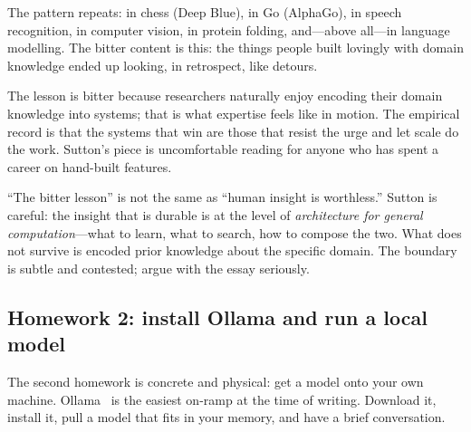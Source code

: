 The pattern repeats: in chess (Deep Blue), in Go (AlphaGo),
in speech recognition, in computer vision, in protein
folding, and---above all---in language modelling.  The bitter
content is this: the things people built lovingly with
domain knowledge ended up looking, in retrospect, like
detours.

\begin{intuition}
  The lesson is bitter because researchers naturally enjoy
  encoding their domain knowledge into systems; that is what
  expertise feels like in motion.  The empirical record is
  that the systems that win are those that resist the urge
  and let scale do the work.  Sutton's piece is uncomfortable
  reading for anyone who has spent a career on hand-built
  features.
\end{intuition}

\begin{remark}
  ``The bitter lesson'' is not the same as ``human insight is
  worthless.''  Sutton is careful: the insight that is durable
  is at the level of \emph{architecture for general
  computation}---what to learn, what to search, how to compose
  the two.  What does not survive is encoded prior knowledge
  about the specific domain.  The boundary is subtle and
  contested; argue with the essay seriously.
\end{remark}

\subsection{Homework 2: install Ollama and run a local model}

The second homework is concrete and physical: get a model
onto your own machine.  Ollama~\cite{ollama} is the easiest
on-ramp at the time of writing.  Download it, install it,
pull a model that fits in your memory, and have a brief
conversation.


